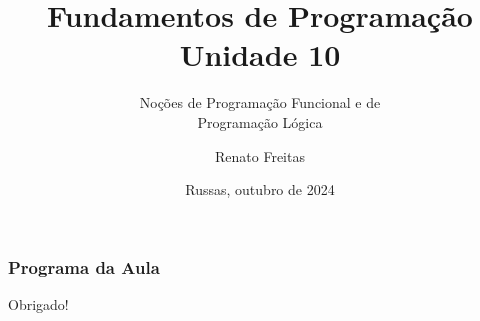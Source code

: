 \documentclass[11pt]{beamer}
\begin{document}
	\title{Fundamentos de Programação \\ Unidade 10}
	\subtitle{Noções de Programação Funcional e de \\Programação Lógica}
	\author{Renato Freitas}
	\date{Russas, outubro de 2024}
	\begin{frame}[plain]
		\maketitle
	\end{frame}
	
	
	\begin{frame}
		\frametitle{Programa da Aula}
		\tableofcontents
	\end{frame}


	



	\begin{frame}[plain]
		\maketitle
		\centering
		Obrigado!
	\end{frame}
\end{document}

